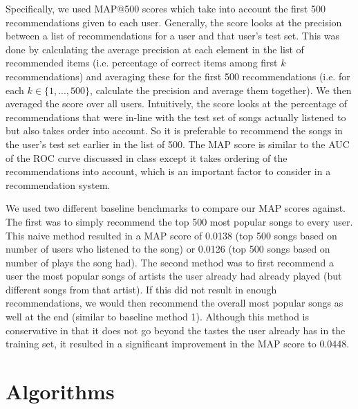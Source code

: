 \documentclass[11pt,preprint]{aastex}
\begin{document}
Specifically, we used MAP@500 scores which take into account the first 500 recommendations given to each user. Generally, the score looks at the precision between a list of recommendations for a user and that user's test set. This was done by calculating the average precision at each element in the list of recommended items (i.e. percentage of correct items among first $k$ recommendations) and averaging these for the first 500 recommendations (i.e. for each $k \in \{1, ..., 500\}$, calculate the precision and average them together).
We then averaged the score over all users. Intuitively, the score looks at the percentage of recommendations that were in-line with the test set of songs actually listened to but also takes order into account. So it is preferable to recommend the songs in the user's test set earlier in the list of 500. The MAP score is similar to the AUC of the ROC curve discussed in class except it takes ordering of the recommendations into account, which is an important factor to consider in a recommendation system.

We used two different baseline benchmarks \citep{McFee:2012:MSD:2187980.2188222} to compare our MAP scores against. The first was to simply recommend the top 500 most popular songs to every user. This naive method resulted in a MAP score of 0.0138 (top 500 songs based on number of users who listened to the song) or 0.0126 (top 500 songs based on number of plays the song had). The second method was to first recommend a user the most popular songs of artists the user already had already played (but different songs from that artist). If this did not result in enough recommendations, we would then recommend the overall most popular songs as well at the end (similar to baseline method 1). Although this method is conservative in that it does not go beyond the tastes the user already has in the training set, it resulted in a significant improvement in the MAP score to 0.0448.

\section{Algorithms}
\end{document}
